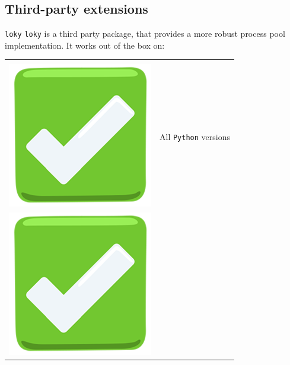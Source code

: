 \documentclass[13pt, usenames,dvipsnames]{beamer} %
\newcommand{\mycode}[2][\tiny] {\texttt{#2}}
\begin{document}
    \subsection{Third-party extensions}

    \begin{frame}[t]{\mycode[\small]{loky}}
        \vspace{1em}
        \mycode[\small]{loky} is a third party package, that provides a more
        robust process pool implementation. It works out of the box on:
        \begin{tabular}{m{0.5cm} m{10cm}}
            & \\
            \includegraphics[width=\linewidth] {media/green-tick-emoji.png} &
            All \mycode[\scriptsize]{Python} versions \\ \includegraphics[width=\linewidth] {media/green-tick-emoji.png} &

\end{tabular}
\end{frame}
\end{document}
